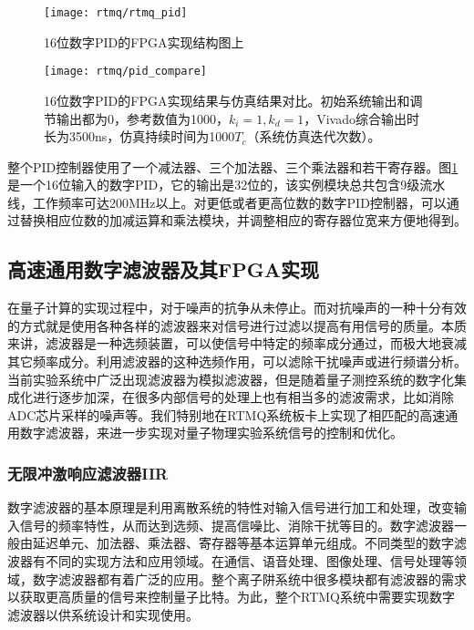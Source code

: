 \begin{figure}
    \centering
    \caption[16位数字PID的FPGA实现结构图]{16位数字PID的FPGA实现结构图上\label{fig:digital_pid_structure_16bits}}
    \texttt{[image: rtmq/rtmq\_pid]}
\end{figure}

\begin{figure}
    \centering
    \caption[16位数字PID的FPGA实现结果与仿真结果对比]{16位数字PID的FPGA实现结果与仿真结果对比。初始系统输出和调节输出都为0，参考数值为1000，$k_i=1, k_d=1$，Vivado综合输出时长为3500ns，仿真持续时间为1000$T_c$（系统仿真迭代次数）。\label{fig:pid_compare}}
    \texttt{[image: rtmq/pid\_compare]}
\end{figure}

整个PID控制器使用了一个减法器、三个加法器、三个乘法器和若干寄存器。图\ref{fig:digital_pid_structure_16bits}是一个16位输入的数字PID，它的输出是32位的，该实例模块总共包含9级流水线，工作频率可达200MHz以上。对更低或者更高位数的数字PID控制器，可以通过替换相应位数的加减运算和乘法模块，并调整相应的寄存器位宽来方便地得到。






\subsection[高速通用数字滤波器及其FPGA实现]{高速通用数字滤波器及其FPGA实现\label{section:digital_iir}}

在量子计算的实现过程中，对于噪声的抗争从未停止。而对抗噪声的一种十分有效的方式就是使用各种各样的滤波器来对信号进行过滤以提高有用信号的质量。本质来讲，滤波器是一种选频装置，可以使信号中特定的频率成分通过，而极大地衰减其它频率成分。利用滤波器的这种选频作用，可以滤除干扰噪声或进行频谱分析。
当前实验系统中广泛出现滤波器为模拟滤波器，但是随着量子测控系统的数字化集成化进行逐步加深，在很多内部信号的处理上也有相当多的滤波需求，比如消除ADC芯片采样的噪声等。我们特别地在RTMQ系统板卡上实现了相匹配的高速通用数字滤波器，来进一步实现对量子物理实验系统信号的控制和优化。


\subsubsection[无限冲激响应滤波器IIR]{无限冲激响应滤波器IIR}
数字滤波器的基本原理是利用离散系统的特性对输入信号进行加工和处理，改变输入信号的频率特性，从而达到选频、提高信噪比、消除干扰等目的。数字滤波器一般由延迟单元、加法器、乘法器、寄存器等基本运算单元组成。不同类型的数字滤波器有不同的实现方法和应用领域。在通信、语音处理、图像处理、信号处理等领域，数字滤波器都有着广泛的应用。整个离子阱系统中很多模块都有滤波器的需求以获取更高质量的信号来控制量子比特。为此，整个RTMQ系统中需要实现数字滤波器以供系统设计和实现使用。

